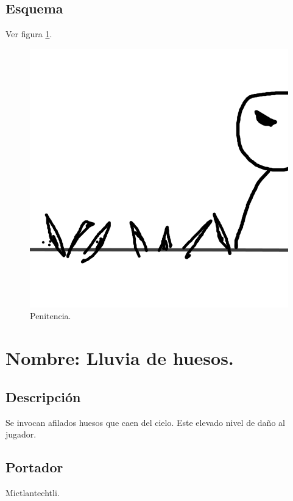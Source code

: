 \subsection{Esquema}
			Ver figura \ref{fig:penitencia}.
			\begin{figure}
				\centering
				\includegraphics[height=0.2 \textheight]{Imagenes/penitencia}
				\caption{Penitencia.}
				\label{fig:penitencia}
			\end{figure}

\section{Nombre: Lluvia de huesos.}\label{hab.LluHuesos}
\subsection{Descripción}
Se invocan afilados huesos que caen del cielo. Este  elevado nivel de daño al jugador.
\subsection{Portador}
Mictlantechtli.
